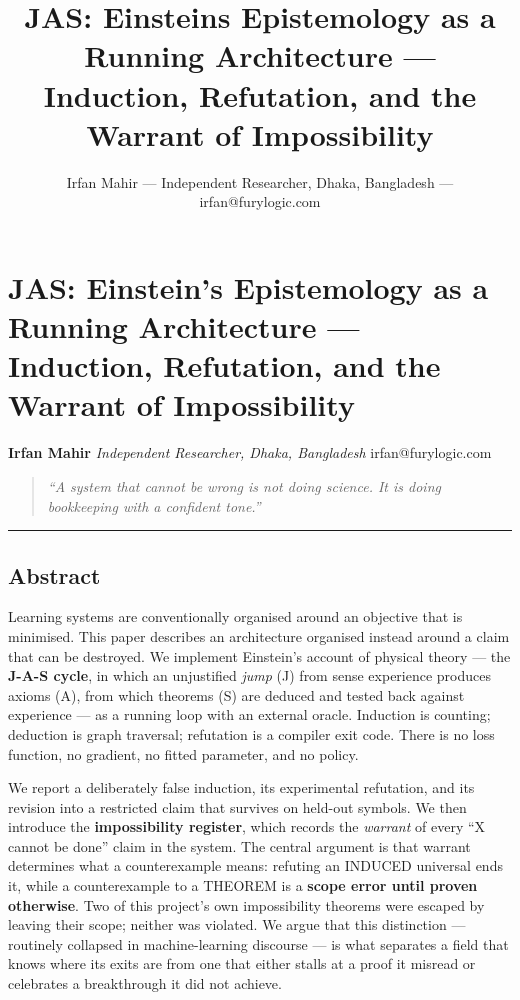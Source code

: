 \documentclass[
  11pt,
  a4paper,
]{article}
\title{JAS: Einstein\textquotesingle s Epistemology as a Running
Architecture --- Induction, Refutation, and the Warrant of
Impossibility}
\author{Irfan Mahir --- Independent Researcher, Dhaka, Bangladesh ---
irfan@furylogic.com}
\date{}
\begin{document}
\maketitle

{
\hypersetup{linkcolor=}
\setcounter{tocdepth}{3}
\tableofcontents
}
\section{JAS: Einstein's Epistemology as a Running Architecture ---
Induction, Refutation, and the Warrant of
Impossibility}\label{jas-einsteins-epistemology-as-a-running-architecture-induction-refutation-and-the-warrant-of-impossibility}

\textbf{Irfan Mahir} \emph{Independent Researcher, Dhaka, Bangladesh}
irfan@furylogic.com

\begin{quote}
\emph{``A system that cannot be wrong is not doing science. It is doing
bookkeeping with a confident tone.''}
\end{quote}

\begin{center}\rule{0.5\linewidth}{0.5pt}\end{center}

\subsection{Abstract}\label{abstract}

Learning systems are conventionally organised around an objective that
is minimised. This paper describes an architecture organised instead
around a claim that can be destroyed. We implement Einstein's account of
physical theory --- the \textbf{J-A-S cycle}, in which an unjustified
\emph{jump} (J) from sense experience produces axioms (A), from which
theorems (S) are deduced and tested back against experience --- as a
running loop with an external oracle. Induction is counting; deduction
is graph traversal; refutation is a compiler exit code. There is no loss
function, no gradient, no fitted parameter, and no policy.

We report a deliberately false induction, its experimental refutation,
and its revision into a restricted claim that survives on held-out
symbols. We then introduce the \textbf{impossibility register}, which
records the \emph{warrant} of every ``X cannot be done'' claim in the
system. The central argument is that warrant determines what a
counterexample means: refuting an INDUCED universal ends it, while a
counterexample to a THEOREM is a \textbf{scope error until proven
otherwise}. Two of this project's own impossibility theorems were
escaped by leaving their scope; neither was violated. We argue that this
distinction --- routinely collapsed in machine-learning discourse --- is
what separates a field that knows where its exits are from one that
either stalls at a proof it misread or celebrates a breakthrough it did
not achieve.
\end{document}
